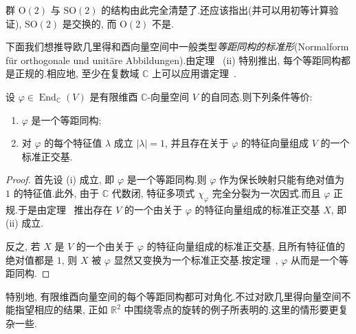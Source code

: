 群 $\mathrm{O}(2)$ 与 $\mathrm{SO}(2)$ 的结构由此完全清楚了.还应该指出(并可以用初等计算验证), $\mathrm{SO}(2)$ 是交换的, 而 $\mathrm{O}(2)$ 不是.

下面我们想推导欧几里得和酉向量空间中一般类型\emph{等距同构的标准形}(\textup{Normalform für orthogonale und unitäre Abbildungen}).由定理~ (ii) 特别推出, 每个等距同构都是正规的.相应地, 至少在复数域 $\mathbb{C}$ 上可以应用谱定理~.

\begin{theorem}\label{thm:7.5.7}
设 $\varphi \in \operatorname{End}_{\mathbb{C}}(V)$ 是有限维酉 $\mathbb{C}$-向量空间 $V$ 的自同态.则下列条件等价:
\begin{enumerate}
\item[(i)] $\varphi$ 是一个等距同构;
\item[(ii)] 对 $\varphi$ 的每个特征值 $\lambda$ 成立 $|\lambda| = 1$, 并且存在关于 $\varphi$ 的特征向量组成 $V$ 的一个标准正交基.
\end{enumerate}
\end{theorem}

\begin{proof}
首先设 (i) 成立, 即 $\varphi$ 是一个等距同构.则 $\varphi$ 作为保长映射只能有绝对值为 $1$ 的特征值.此外, 由于 $\mathbb{C}$ 代数闭, 特征多项式 $\chi_\varphi$ 完全分裂为一次因式.而且 $\varphi$ 正规.于是由定理~ 推出存在 $V$ 的一个由关于 $\varphi$ 的特征向量组成的标准正交基 $X$, 即 (ii) 成立.

反之, 若 $X$ 是 $V$ 的一个由关于 $\varphi$ 的特征向量组成的标准正交基, 且所有特征值的绝对值都是 $1$, 则 $X$ 被 $\varphi$ 显然又变换为一个标准正交基.按定理~, $\varphi$ 从而是一个等距同构.
\end{proof}

特别地, 有限维酉向量空间的每个等距同构都可对角化.不过对欧几里得向量空间不能指望相应的结果, 正如 $\mathbb{R}^2$ 中围绕零点的旋转的例子所表明的.这里的情形要更复杂一些.

